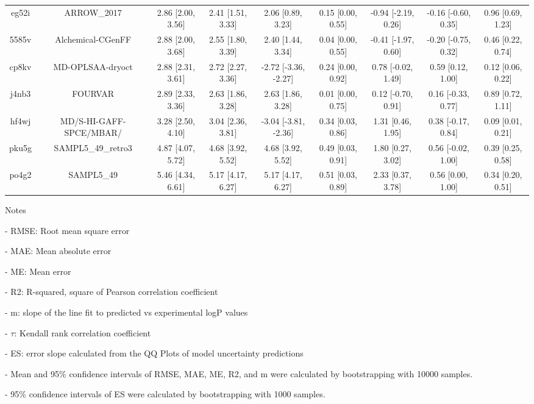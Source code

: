 \documentclass{article}
\begin{document}
\begin{center}
\begin{longtable}{|ccccccccc|}
 eg52i &                                        ARROW\_2017 &  2.86 [2.00, 3.56] &  2.41 [1.51, 3.33] &     2.06 [0.89, 3.23] &  0.15 [0.00, 0.55] &  -0.94 [-2.19, 0.26] &  -0.16 [-0.60, 0.35] &     0.96 [0.69, 1.23] \\
 5585v &                                  Alchemical-CGenFF &  2.88 [2.00, 3.68] &  2.55 [1.80, 3.39] &     2.40 [1.44, 3.34] &  0.04 [0.00, 0.55] &  -0.41 [-1.97, 0.60] &  -0.20 [-0.75, 0.32] &     0.46 [0.22, 0.74] \\
 cp8kv &                                   MD-OPLSAA-dryoct &  2.88 [2.31, 3.61] &  2.72 [2.27, 3.36] &  -2.72 [-3.36, -2.27] &  0.24 [0.00, 0.92] &   0.78 [-0.02, 1.49] &    0.59 [0.12, 1.00] &     0.12 [0.06, 0.22] \\
 j4nb3 &                                            FOURVAR &  2.89 [2.33, 3.36] &  2.63 [1.86, 3.28] &     2.63 [1.86, 3.28] &  0.01 [0.00, 0.75] &   0.12 [-0.70, 0.91] &   0.16 [-0.33, 0.77] &     0.89 [0.72, 1.11] \\
 hf4wj &                            MD/S-HI-GAFF-SPCE/MBAR/ &  3.28 [2.50, 4.10] &  3.04 [2.36, 3.81] &  -3.04 [-3.81, -2.36] &  0.34 [0.03, 0.86] &    1.31 [0.46, 1.95] &   0.38 [-0.17, 0.84] &     0.09 [0.01, 0.21] \\
 pku5g &                                 SAMPL5\_49\_retro3 &  4.87 [4.07, 5.72] &  4.68 [3.92, 5.52] &     4.68 [3.92, 5.52] &  0.49 [0.03, 0.91] &    1.80 [0.27, 3.02] &   0.56 [-0.02, 1.00] &     0.39 [0.25, 0.58] \\
 po4g2 &                                         SAMPL5\_49 &  5.46 [4.34, 6.61] &  5.17 [4.17, 6.27] &     5.17 [4.17, 6.27] &  0.51 [0.03, 0.89] &    2.33 [0.37, 3.78] &    0.56 [0.00, 1.00] &     0.34 [0.20, 0.51] \\
\end{longtable}
\end{center}

Notes

- RMSE: Root mean square error

- MAE: Mean absolute error

- ME: Mean error

- R2: R-squared, square of Pearson correlation coefficient

- m: slope of the line fit to predicted vs experimental logP values

- $\tau$:  Kendall rank correlation coefficient

- ES: error slope calculated from the QQ Plots of model uncertainty predictions

- Mean and 95\% confidence intervals of RMSE, MAE, ME, R2, and m were calculated by bootstrapping with 10000 samples.

- 95\% confidence intervals of ES were calculated by bootstrapping with 1000 samples.\end{document}
\end{document}
